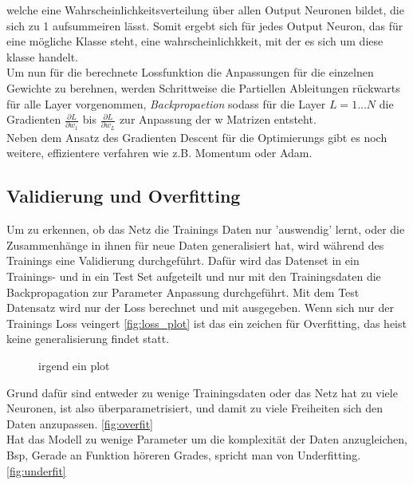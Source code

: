 welche eine Wahrscheinlichkeitsverteilung über allen Output 
Neuronen bildet, die sich zu 1 aufsummeiren lässt. Somit ergebt sich
für jedes Output Neuron, das für eine mögliche Klasse steht, eine 
wahrscheinlichkkeit, mit der es sich um diese klasse handelt.
\\
Um nun für die berechnete Lossfunktion die Anpassungen für die 
einzelnen Gewichte zu berehnen, werden Schrittweise die Partiellen
Ableitungen rückwarts für alle Layer vorgenommen, \textit{Backpropaetion}
sodass für die Layer $L = 1...N$ die Gradienten $\frac{\partial L}{\partial 
w_{1}}$ bis $\frac{\partial L}{\partial w_{L}}$ zur Anpassung 
der w Matrizen entsteht.
\\
Neben dem Ansatz des Gradienten Descent für die Optimierungs 
gibt es noch weitere, effizientere verfahren wie z.B. Momentum oder Adam.



\subsection{Validierung und Overfitting}

Um zu erkennen, ob das Netz die Trainings Daten nur 'auswendig' lernt, oder die 
Zusammenhänge in ihnen für neue Daten generalisiert hat, wird während des Trainings 
eine Validierung durchgeführt. Dafür wird das Datenset in ein Trainings- und in 
ein Test Set aufgeteilt und nur mit den Trainingsdaten die Backpropagation zur 
Parameter Anpassung durchgeführt. Mit dem Test Datensatz wird nur der Loss berechnet und
mit ausgegeben. Wenn sich nur der Trainings Loss veingert \ref{fig:loss_plot} ist das ein zeichen 
für Overfitting, das heist keine generalisierung findet statt. 


\begin{figure}[htb]
    \centering
    
    \caption{irgend ein plot}
    \label{fig:ptl}
\end{figure}

Grund dafür sind entweder zu wenige Trainingsdaten oder das Netz hat zu viele Neuronen, ist also 
überparametrisiert, und damit zu viele Freiheiten sich den Daten anzupassen. \ref{fig:overfit} 
\\
Hat das Modell zu wenige Parameter um die komplexität der Daten anzugleichen, Bsp, Gerade an Funktion 
höreren Grades, spricht man von Underfitting. \ref{fig:underfit}



